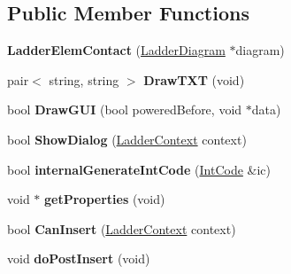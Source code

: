 \subsection*{Public Member Functions}
\begin{DoxyCompactItemize}
\item 
\hypertarget{class_ladder_elem_contact_aa5351f083bfd1e7c9c57203e05b0f81d}{{\bfseries Ladder\-Elem\-Contact} (\hyperlink{class_ladder_diagram}{Ladder\-Diagram} $\ast$diagram)}\label{class_ladder_elem_contact_aa5351f083bfd1e7c9c57203e05b0f81d}

\item 
\hypertarget{class_ladder_elem_contact_a71e5cd4d620a52267e7e8c639285c2de}{pair$<$ string, string $>$ {\bfseries Draw\-T\-X\-T} (void)}\label{class_ladder_elem_contact_a71e5cd4d620a52267e7e8c639285c2de}

\item 
\hypertarget{class_ladder_elem_contact_a7bafad9b444699d0547966751c6340c7}{bool {\bfseries Draw\-G\-U\-I} (bool powered\-Before, void $\ast$data)}\label{class_ladder_elem_contact_a7bafad9b444699d0547966751c6340c7}

\item 
\hypertarget{class_ladder_elem_contact_a7ff726a612c42daabfdd7f323beaeeb0}{bool {\bfseries Show\-Dialog} (\hyperlink{struct_ladder_context}{Ladder\-Context} context)}\label{class_ladder_elem_contact_a7ff726a612c42daabfdd7f323beaeeb0}

\item 
\hypertarget{class_ladder_elem_contact_af15149b1f93090b7219ddff4ee794d12}{bool {\bfseries internal\-Generate\-Int\-Code} (\hyperlink{class_int_code}{Int\-Code} \&ic)}\label{class_ladder_elem_contact_af15149b1f93090b7219ddff4ee794d12}

\item 
\hypertarget{class_ladder_elem_contact_a94a7de0878a167d4933cf3cf92bd2545}{void $\ast$ {\bfseries get\-Properties} (void)}\label{class_ladder_elem_contact_a94a7de0878a167d4933cf3cf92bd2545}

\item 
\hypertarget{class_ladder_elem_contact_aec9b770a27cf6cb905a6ee21541ee2a9}{bool {\bfseries Can\-Insert} (\hyperlink{struct_ladder_context}{Ladder\-Context} context)}\label{class_ladder_elem_contact_aec9b770a27cf6cb905a6ee21541ee2a9}

\item 
\hypertarget{class_ladder_elem_contact_a284ae27d3862a9c455366c1eef7855bd}{void {\bfseries do\-Post\-Insert} (void)}\label{class_ladder_elem_contact_a284ae27d3862a9c455366c1eef7855bd}


\end{DoxyCompactItemize}
